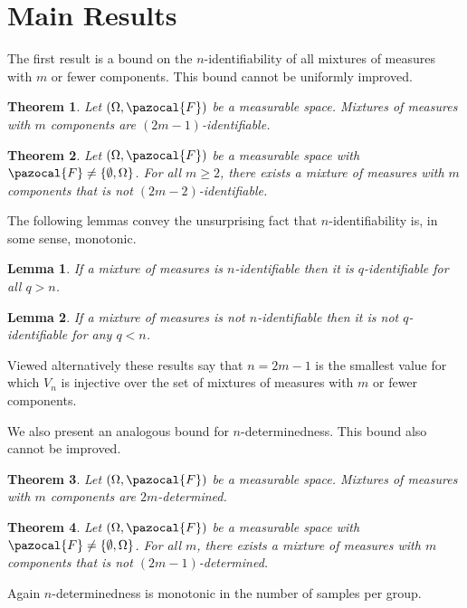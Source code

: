 \documentclass[aos,preprint]{imsart}
\def\sF{\pazocal{F}}
\theoremstyle{plain}
\newtheorem{thm}{Theorem}[section]
\newtheorem{lem}{Lemma}[section]
\theoremstyle{defintion}
\begin{document}
	\section{Main Results}\label{sec:mainresults}
	The first result is a bound on the $n$-identifiability of all mixtures of measures with $m$ or fewer components. This bound cannot be uniformly improved.
	\begin{thm} \label{thm:ident}
		Let $\left( \Omega,\sF \right)$ be a measurable space. Mixtures of measures with $m$ components are $(2m-1)$-identifiable.
	\end{thm}

	\begin{thm} \label{thm:noident}
		Let $\left( \Omega, \sF \right)$ be a measurable space with $\sF \neq \left\{ \emptyset,\Omega \right\}$. For all $m \ge 2$, there exists a mixture of measures with $m$ components that is not $(2m-2)$-identifiable.
	\end{thm}
	The following lemmas convey the unsurprising fact that $n$-identifiability is, in some sense, monotonic.
	\begin{lem}\label{lem:ident} \sloppy
		If a mixture of measures is $n$-identifiable then it is $q$-identifiable for all $q>n$.
	\end{lem}
	\begin{lem} \label{lem:noident}
		If a mixture of measures is not $n$-identifiable then it is not $q$-identifiable for any $q<n$.
	\end{lem}
	Viewed alternatively these results say that $n=2m-1$ is the smallest value for which $V_{n}$ is injective over the set of mixtures of measures with $m$ or fewer components.

	We also present an analogous bound for $n$-determinedness. This bound also cannot be improved.
	\begin{thm}\label{thm:det}
		Let $\left( \Omega,\sF \right)$ be a measurable space. Mixtures of measures with $m$ components are $2m$-determined.
	\end{thm}

	\begin{thm} \label{thm:nodet}
		Let $\left( \Omega, \sF \right)$ be a measurable space with $\sF \neq \left\{ \emptyset,\Omega \right\}$. For all $m$, there exists a mixture of measures with $m$ components that is not $(2m-1)$-determined.
	\end{thm}

	Again $n$-determinedness is monotonic in the number of samples per group.
\end{document}
